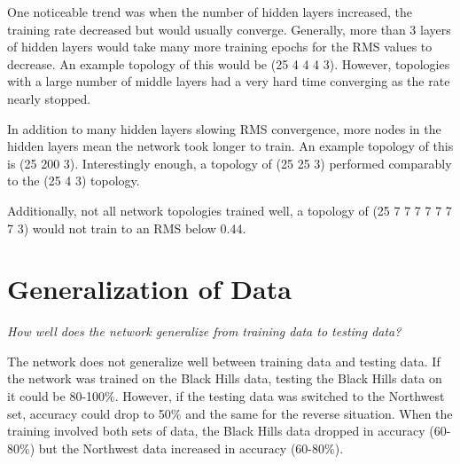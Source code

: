 \documentclass[•]{article}
\begin{document}
One noticeable trend was when the number of hidden layers increased, the training rate decreased but would usually converge. Generally, more than 3 layers of hidden layers would take many more training epochs for the RMS values to decrease. An example topology of this would be (25 4 4 4 3). However, topologies with a large number of middle layers had a very hard time converging as the rate nearly stopped.

In addition to many hidden layers slowing RMS convergence, more nodes in the hidden layers mean the network took longer to train. An example topology of this is (25 200 3). Interestingly enough, a topology of (25 25 3) performed comparably to the (25 4 3) topology. 

Additionally, not all network topologies trained well, a topology of (25 7 7 7 7 7 7 7 3) would not train to an RMS below 0.44. 


\section{Generalization of Data}
\textit{How well does the network generalize from training data to testing data?}

The network does not generalize well between training data and testing data. If the network was trained on the Black Hills data, testing the Black Hills data on it could be 80-100\%. However, if the testing data was switched to the Northwest set, accuracy could drop to 50\% and the same for the reverse situation. When the training involved both sets of data, the Black Hills data dropped in accuracy (60-80\%) but the Northwest data increased in accuracy (60-80\%).
\end{document}
